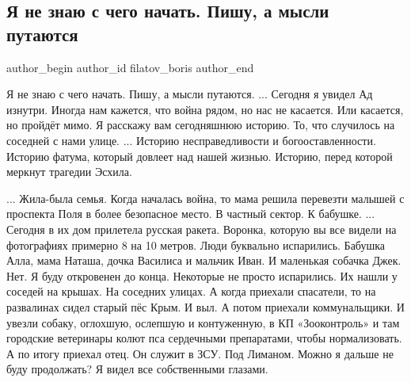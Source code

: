  
 
 
 
 
 
\subsection{Я не знаю с чего начать. Пишу, а мысли путаются}
\label{sec:29_09_2022.fb.filatov_boris.1.s_chego_nachat}
 

\ifcmt
 author_begin
   author_id filatov_boris
 author_end
\fi

\obeycr
Я не знаю с чего начать.
Пишу, а мысли путаются.
...
Сегодня я увидел Ад изнутри.
Иногда нам кажется, что война рядом, но нас не касается.
Или касается, но пройдёт мимо.
Я расскажу вам сегодняшнюю историю.
То, что случилось на соседней с нами улице.
... 
Историю несправедливости и богооставленности.
Историю фатума, который довлеет над нашей жизнью.
Историю, перед которой меркнут трагедии Эсхила.
\restorecr


\obeycr
...
Жила-была семья. 
Когда началась война, то мама решила перевезти малышей с проспекта Поля в более безопасное место.
В частный сектор. К бабушке.
...
Сегодня в их дом прилетела русская ракета.
Воронка, которую вы все видели на фотографиях примерно 8 на 10 метров.
Люди буквально испарились. Бабушка Алла, мама Наташа, дочка Василиса  и мальчик Иван.
И маленькая собачка Джек.
Нет. Я буду откровенен до конца. Некоторые не просто испарились.
Их нашли у соседей на крышах. 
На соседних улицах.
А когда приехали спасатели, то на развалинах сидел старый пёс Крым.
И выл.
А потом приехали коммунальщики. 
И увезли собаку, оглохшую, ослепшую и контуженную, в КП «Зооконтроль» и там городские ветеринары колют пса сердечными препаратами, чтобы нормализовать.
А по итогу приехал отец.
Он служит в ЗСУ. Под Лиманом.
Можно я дальше не буду продолжать?
Я видел все собственными глазами.
\restorecr

